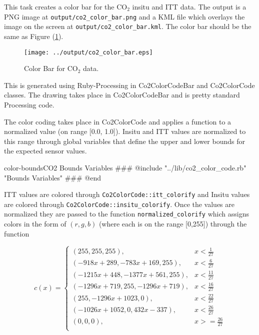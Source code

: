 \documentclass[12pt]{article}
\begin{document}
This task creates a color bar for the CO$_2$ insitu and ITT data.  The output is a PNG image at \texttt{output/co2\_color\_bar.png} and a KML file which overlays the image on the screen at \texttt{output/co2\_color\_bar.kml}.  The color bar should be the same as Figure (\ref{co2-color-bar}).   

\begin{figure}
\centering
\texttt{[image: ../output/co2\_color\_bar.eps]}
\caption{Color Bar for CO$_2$ data.}
\label{co2-color-bar}
\end{figure}

This is generated using Ruby-Processing in Co2ColorCodeBar and Co2ColorCode classes.  The drawing takes place in Co2ColorCodeBar and is pretty standard Processing code.  

The color coding takes place in Co2ColorCode and applies a function to a normalized value (on range [0.0, 1.0]).  Insitu and ITT values are normalized to this range through global variables that define the upper and lower bounds for the expected sensor values.

\begin{code}{color-bounds}{CO2 Bounds Variables}
### @include "../lib/co2_color_code.rb" "Bounds Variables"
### @end
\end{code}

ITT values are colored through \texttt{Co2ColorCode::itt\_colorify} and Insitu values are colored through \texttt{Co2ColorCode::insitu\_colorify}.  Once the values are normalized they are passed to the function \texttt{normalized\_colorify} which assigns colors in the form of $(r,g,b)$ (where each is on the range [0,255]) through the function

\begin{equation}
\label{normalized-colorify}
c(x)= \begin{cases}
(255,255,255), & x < \frac{1}{27} \\
(-918x+289,-783x+169,255), & x < \frac{6}{27} \\
(-1215x+448,-1377x+561,255), & x < \frac{11}{27} \\
(-1296x+719,255,-1296x+719), & x < \frac{16}{27} \\
(255,-1296x+1023,0), & x < \frac{22}{27} \\
(-1026x+1052,0,432x-337), & x < \frac{26}{27} \\
(0,0,0), & x >= \frac{26}{27} \\
\end{cases}
\end{equation}
\end{document}
